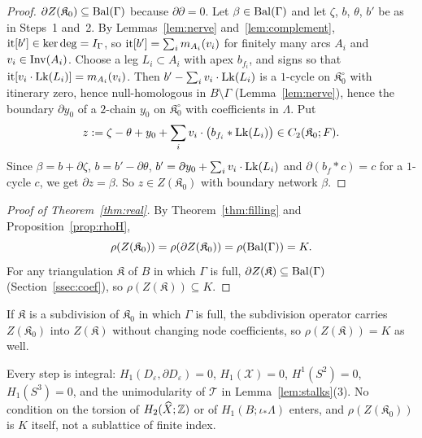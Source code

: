 \begin{proof}
$\partial Z(\mathfrak K_0)\subseteq\mathrm{Bal}(\Gamma)$ because $\partial\partial=0$. Let $\beta\in\mathrm{Bal}(\Gamma)$ and let $\zeta$, $b$, $\theta$, $b'$ be as in
Steps~1 and~2. By Lemmas~\ref{lem:nerve} and~\ref{lem:complement}, $\operatorname{it}[b']\in\ker\deg=I_\Gamma$, so
$\operatorname{it}[b']=\sum_i m_{A_i}(v_i)$ for finitely many arcs $A_i$ and $v_i\in\operatorname{Inv}(A_i)$. Choose a leg $L_i\subset A_i$ with
apex $b_{f_i}$, and signs so that $\operatorname{it}[v_i\cdot\operatorname{Lk}(L_i)]=m_{A_i}(v_i)$. Then $b'-\sum_iv_i\cdot\operatorname{Lk}(L_i)$ is a $1$-cycle on
$\mathfrak K_0^\circ$ with itinerary zero, hence null-homologous in $B\setminus\Gamma$ (Lemma~\ref{lem:nerve}), hence the boundary
$\partial y_0$ of a $2$-chain $y_0$ on $\mathfrak K_0^\circ$ with coefficients in $\Lambda$. Put
\[
z:=\zeta-\theta+y_0+\sum_iv_i\cdot\bigl(b_{f_i}*\operatorname{Lk}(L_i)\bigr)\in C_2(\mathfrak K_0;F).
\]
Since $\beta=b+\partial\zeta$, $b=b'-\partial \theta$, $b'=\partial y_0+\sum_iv_i\cdot\operatorname{Lk}(L_i)$ and $\partial(b_f*c)=c$ for a $1$-cycle
$c$, we get $\partial z=\beta$. So $z\in Z(\mathfrak K_0)$ with boundary network $\beta$.
\end{proof}

\begin{proof}[Proof of Theorem~\ref{thm:real}]
By Theorem~\ref{thm:filling} and Proposition~\ref{prop:rhoH},
\[
\rho(Z(\mathfrak K_0))=\rho(\partial Z(\mathfrak K_0))=\rho(\mathrm{Bal}(\Gamma))=K.
\]
For any triangulation $\mathfrak K$ of $B$ in which $\Gamma$ is full, $\partial Z(\mathfrak K)\subseteq\mathrm{Bal}(\Gamma)$
(Section~\ref{ssec:coef}), so $\rho(Z(\mathfrak K))\subseteq K$.
\end{proof}

If $\mathfrak K$ is a subdivision of $\mathfrak K_0$ in which $\Gamma$ is full, the subdivision operator carries $Z(\mathfrak K_0)$
into $Z(\mathfrak K)$ without changing node coefficients, so $\rho(Z(\mathfrak K))=K$ as well.

\begin{remark}[no torsion]\label{rem:notorsion}
Every step is integral: $H_1(D_\varepsilon,\partial D_\varepsilon)=0$, $H_1(\mathcal X)=0$, $H^1(S^2)=0$, $H_1(S^3)=0$, and the
unimodularity of $\mathcal T$ in Lemma~\ref{lem:stalks}(3). No condition on the torsion of $H_2(\widehat X;\mathbb Z)$ or of
$H_1(B;\iota_*\Lambda)$ enters, and $\rho(Z(\mathfrak K_0))$ is $K$ itself, not a sublattice of finite index.
\end{remark}

